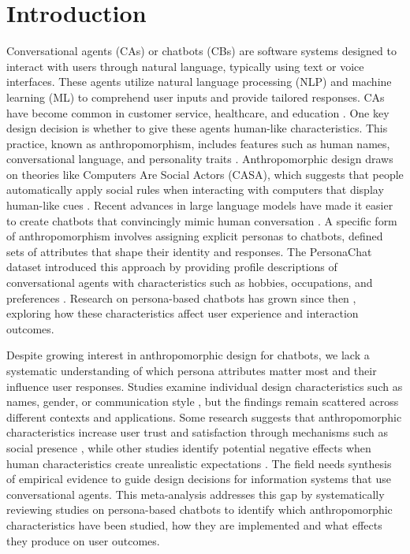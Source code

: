 \documentclass{article}
\begin{document}
\section{Introduction}
\label{sec:introduction}
Conversational agents (CAs) or chatbots (CBs) are software systems designed to interact with users through natural language, typically using text or voice interfaces. These agents utilize natural language processing (NLP) and machine learning (ML) to comprehend user inputs and provide tailored responses. CAs have become common in customer service, healthcare, and education \citep{araujo2018living}. One key design decision is whether to give these agents human-like characteristics. This practice, known as anthropomorphism, includes features such as human names, conversational language, and personality traits \citep{epley2007seeing}. Anthropomorphic design draws on theories like Computers Are Social Actors (CASA), which suggests that people automatically apply social rules when interacting with computers that display human-like cues \citep{nass1994computers,reeves1996media}. Recent advances in large language models have made it easier to create chatbots that convincingly mimic human conversation \citep{pnas2025anthropomorphic}. A specific form of anthropomorphism involves assigning explicit personas to chatbots, defined sets of attributes that shape their identity and responses. The PersonaChat dataset introduced this approach by providing profile descriptions of conversational agents with characteristics such as hobbies, occupations, and preferences \citep{zhang2018personalizing}. Research on persona-based chatbots has grown since then \citep{chen2024trends}, exploring how these characteristics affect user experience and interaction outcomes.

Despite growing interest in anthropomorphic design for chatbots, we lack a systematic understanding of which persona attributes matter most and their influence user responses. Studies examine individual design characteristics such as names, gender, or communication style \citep{go2019humanizing,seeger2021texting}, but the findings remain scattered across different contexts and applications. Some research suggests that anthropomorphic characteristics increase user trust and satisfaction through mechanisms such as social presence \citep{konya2023anthropomorphism,blut2021understanding}, while other studies identify potential negative effects when human characteristics create unrealistic expectations \citep{crolic2022blame,ciechanowski2019shades}. The field needs synthesis of empirical evidence to guide design decisions for information systems that use conversational agents. This meta-analysis addresses this gap by systematically reviewing studies on persona-based chatbots to identify which anthropomorphic characteristics have been studied, how they are implemented and what effects they produce on user outcomes.
\end{document}

